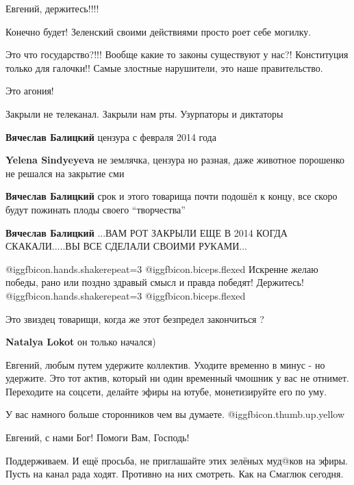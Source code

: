\begin{itemize}
Евгений, держитесь!!!!

Конечно будет! Зеленский своими действиями просто роет себе могилку.


Это что государство?!!! Вообще какие то законы существуют у нас?! Конституция
только для галочки!! Самые злостные нарушители, это наше правительство.

Это агония!

Закрыли не телеканал. Закрыли нам рты. Узурпаторы и диктаторы

\begin{itemize} %
\textbf{Вячеслав Балицкий} цензура с февраля 2014 года

\textbf{Yelena Sindyeyeva} не землячка, цензура но разная, даже животное порошенко не решался на закрытие сми

\textbf{Вячеслав Балицкий} срок и этого товарища почти подошёл к концу, все скоро будут пожинать плоды своего \enquote{творчества}

\textbf{Вячеслав Балицкий} ...ВАМ РОТ ЗАКРЫЛИ ЕЩЕ В 2014 КОГДА СКАКАЛИ.....ВЫ ВСЕ СДЕЛАЛИ СВОИМИ РУКАМИ...
\end{itemize} %

 @igg{fbicon.hands.shake}{repeat=3}  @igg{fbicon.biceps.flexed} 
Искренне желаю победы, рано или поздно здравый смысл и правда победят!
Держитесь!
 @igg{fbicon.hands.shake}{repeat=3}  @igg{fbicon.biceps.flexed} 

Это звиздец товарищи, когда же этот безпредел закончиться ?

\textbf{Natalya Lokot} он только начался)


Евгений, любым путем удержите коллектив. Уходите временно в минус - но
удержите. Это тот актив, который ни один временный чмошник у вас не отнимет.
Переходите на соцсети, делайте эфиры на ютубе, монетизируйте его по уму.

У вас намного больше сторонников чем вы думаете. @igg{fbicon.thumb.up.yellow} 

Евгений, с нами Бог! Помоги Вам, Господь!


Поддерживаем. И ещё просьба, не приглашайте этих зелёных муд@ков на эфиры.
Пусть на канал рада ходят. Противно на них смотреть. Как на Смаглюк сегодня.


\end{itemize}
